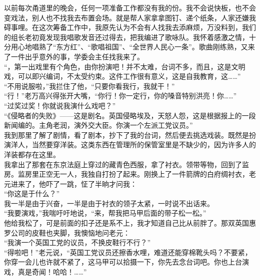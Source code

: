 以前每次甬道里的晚会，任何一项准备工作都没有我的份。我不会说快板，也不会变戏法，别人也不找我去布置会场。就是帮人家拿拿图钉、递个纸条，人家还嫌我碍事哩。在这次筹备工作中，我原先认为不会有人找我去添麻烦，万没料到，我们的组长老初竟发现我唱歌发音还过得去，把我编进了歌咏队。我怀着感激之情，十分用心地唱熟了“东方红”、“歌唱祖国”、“全世界人民心一条”。歌曲刚练熟，又来了一件出乎意外的事，学委会主任找我来了。\\

“，第一出戏里有个角色，由你扮演吧！并不太难，台词不多，而且，这是文明戏，可以即兴编词，不太受约束。这件工作很有意义，这是自我教育，这……”\\

“不用说服啦，”我拦住了他，“只要你看我行，我就干！”\\

“行！”老万高兴得张开大嘴，“你行！你一定行，你的嗓音特别洪亮！你……”\\

“过奖过奖！你就说我演什么戏吧？”\\

“《侵略者的失败》——这是剧名。英国侵略埃及，天怒人怨，这是根据报上的一段新闻编的。主角老润，演外交大臣。你演一个左派工党议员。”\\

我到那里了解了剧情，看了剧本，抄下了我的台词，然后便去挑选戏装。既然是扮演洋人，当然要穿洋装。这类东西在管理所的保管室里是不缺少的，因为许多人的洋装都存在这里。\\

我拿出了那套在东京法庭上穿过的藏青色西服，拿了衬衣。领带等物，回到了监房。监房里正空无一人，我独自打扮了起来。刚换上了一件箭牌的白府绸衬衣，老元进来了，他吓了一跳，怔了半晌才问我：\\

“你这是于什么？”\\

我一半是由于兴奋，一半是由于衬衣的领子太紧，一时说不出话来。\\

“我要演戏，”我喘吁吁地说，“来，帮我把马甲后面的带子松一松。”\\

他给我松了，可是前面的扣子还是系不上，我才知道自己比从前胖了。那双英国惠罗公司的皮鞋也夹脚，我懊恼地问老元：\\

“我演一个英国工党的议员，不换皮鞋行不行？”\\

“得啦吧！”老元说，“英国工党议员还擦香水哩，难道还能穿棉靴头吗？不要紧，你穿一会儿也许就不紧了，这马甲可以拾摄一下，你先去念台词吧。你也上台演戏，真是奇闻！哈哈！……”\\

